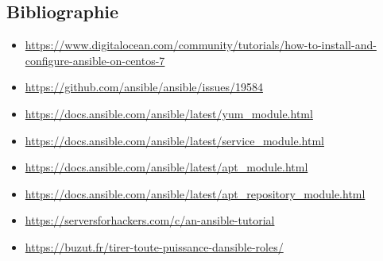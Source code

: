 \documentclass[a4paper, 12pt]{article}
\begin{document}
\subsection{Bibliographie}
\begin{itemize}
    \item \url{https://www.digitalocean.com/community/tutorials/how-to-install-and-configure-ansible-on-centos-7}
    \item \url{https://github.com/ansible/ansible/issues/19584}
    \item \url{https://docs.ansible.com/ansible/latest/yum_module.html}
    \item \url{https://docs.ansible.com/ansible/latest/service_module.html}
    \item \url{https://docs.ansible.com/ansible/latest/apt_module.html}
    \item \url{https://docs.ansible.com/ansible/latest/apt_repository_module.html}
    \item \url{https://serversforhackers.com/c/an-ansible-tutorial}
    \item \url{https://buzut.fr/tirer-toute-puissance-dansible-roles/}
\end{itemize}
\end{document}
